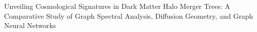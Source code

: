 \documentclass[twocolumn]{aastex631}
\begin{document}
Unveiling Cosmological Signatures in Dark Matter Halo Merger Trees: A Comparative Study of Graph Spectral Analysis, Diffusion Geometry, and Graph Neural Networks
\end{document}
